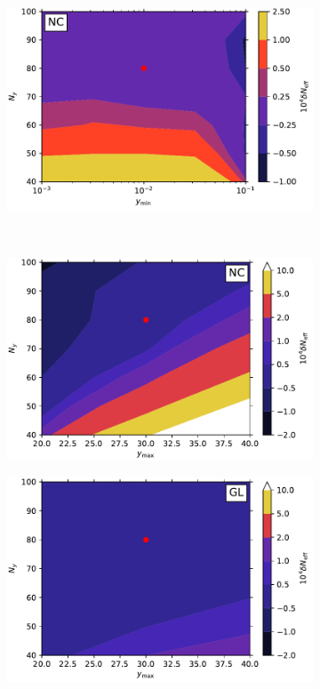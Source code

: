 \documentclass[notitlepage,nofootinbib,showpacs,preprintnumbers,amsmath,amssymb,superscriptaddress,prd,onecolumn]{revtex4-1}
\begin{document}
\begin{figure}[t]
\begin{center}
\begin{subfigure}{.49\textwidth}
\centering
\includegraphics[width=\linewidth]{figures/NC_Ny_ymin.pdf}
\end{subfigure}\\
\begin{subfigure}{.49\textwidth}
\centering
\includegraphics[width=\linewidth]{figures/NC_Ny_ymax.pdf}
\end{subfigure}
\begin{subfigure}{.49\textwidth}
\centering
\includegraphics[width=\linewidth]{figures/GL_Ny_ymax.pdf}

\end{subfigure}
\end{center}
\end{figure}
\end{document}
